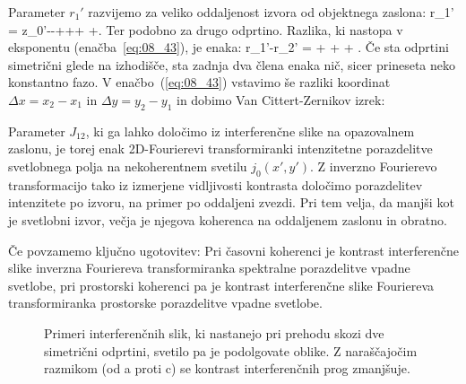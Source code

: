 Parameter $r_1'$ razvijemo za veliko oddaljenost izvora od objektnega zaslona:
\beq
r_1' =  \approx
z_0'--+++
+.
\label{eq:08_44}
\eeq
Ter podobno za drugo odprtino. 
Razlika, ki nastopa v eksponentu (enačba~\ref{eq:08_43}), je enaka:
\beq
r_1'-r_2' = +
+  + .
\label{eq:08_46}
\eeq
Če sta odprtini simetrični glede na izhodišče, sta zadnja dva člena
enaka nič, sicer prineseta neko konstantno fazo. V enačbo~(\ref{eq:08_43}) vstavimo 
še razliki koordinat
$\Delta x = x_2-x_1$ in $\Delta y = y_2-y_1$ in dobimo Van Cittert-Zernikov izrek:

Parameter $J_{12}$, ki ga lahko določimo iz interferenčne slike na opazovalnem zaslonu,
je torej enak 2D-Fourierevi transformiranki intenzitetne porazdelitve svetlobnega polja 
na nekoherentnem svetilu $j_0(x',y')$. Z inverzno Fourierevo transformacijo tako iz izmerjene vidljivosti
kontrasta določimo porazdelitev intenzitete po izvoru, na primer po oddaljeni zvezdi. 
Pri tem velja, da manjši kot je svetlobni izvor, večja je njegova koherenca na oddaljenem 
zaslonu in obratno.

Če povzamemo ključno ugotovitev: Pri časovni koherenci je kontrast interferenčne slike
inverzna Fouriereva transformiranka spektralne porazdelitve vpadne svetlobe, pri prostorski
koherenci pa je kontrast interferenčne slike Fouriereva transformiranka prostorske porazdelitve vpadne svetlobe.
\begin{figure}[h]
\centering
\def\svgwidth{130truemm} 

\caption{Primeri interferenčnih slik, ki nastanejo pri prehodu skozi dve simetrični odprtini, svetilo
pa je podolgovate oblike. Z naraščajočim razmikom (od a proti c) se kontrast interferenčnih prog zmanjšuje.}
\label{fig:08_VCZ_slika}
\end{figure}

